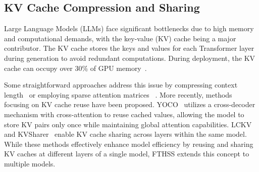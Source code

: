 \subsection{KV Cache Compression and Sharing}

Large Language Models (LLMs) face significant bottlenecks due to high memory and computational demands, with the key-value (KV) cache being a major contributor. The KV cache stores the keys and values for each Transformer layer during generation to avoid redundant computations. During deployment, the KV cache can occupy over 30\% of GPU memory~\cite{kwon2023efficient}. 

Some straightforward approaches address this issue by compressing context length~\cite{ge2024incontextautoencodercontextcompression, jiang2023llmlingua,li2023compressing} or employing sparse attention matrices ~\cite{xiao2023efficient, han2023lm}. More recently, methods focusing on KV cache reuse have been proposed. YOCO~\cite{sun2024you} utilizes a cross-decoder mechanism with cross-attention to reuse cached values, allowing the model to store KV pairs only once while maintaining global attention capabilities. LCKV~\cite{wu2024layer} and KVSharer~\cite{yang2024kvsharerefficientinferencelayerwise} enable KV cache sharing across layers within the same model. While these methods effectively enhance model efficiency by reusing and sharing KV caches at different layers of a single model, FTHSS extends this concept to multiple models.

